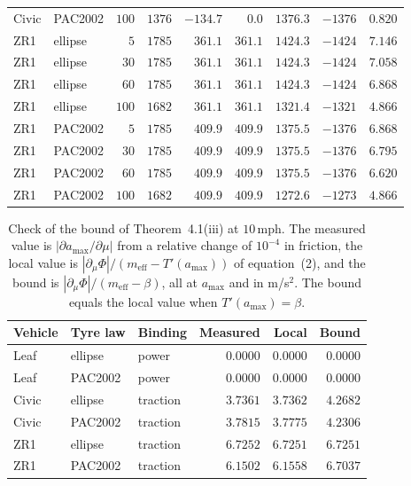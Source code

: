 \documentclass[12pt, twoside]{amsart}
\theoremstyle{definition}
\newcommand{\amax}{a_{\max}}
\newcommand{\meff}{m_{\mathrm{eff}}}
\newcommand{\mainref}[2]{#2}
\newcommand{\maineq}[2]{(#2)}
\begin{document}
\begin{table}[htbp]
\begin{tabular}{llrrrrrrr}
Civic & PAC2002 & $100$ & $1376$ & $-134.7$ & $0.0$ & $1376.3$ & $-1376$ & $0.820$\\
ZR1 & ellipse & $5$ & $1785$ & $361.1$ & $361.1$ & $1424.3$ & $-1424$ & $7.146$\\
ZR1 & ellipse & $30$ & $1785$ & $361.1$ & $361.1$ & $1424.3$ & $-1424$ & $7.058$\\
ZR1 & ellipse & $60$ & $1785$ & $361.1$ & $361.1$ & $1424.3$ & $-1424$ & $6.868$\\
ZR1 & ellipse & $100$ & $1682$ & $361.1$ & $361.1$ & $1321.4$ & $-1321$ & $4.866$\\
ZR1 & PAC2002 & $5$ & $1785$ & $409.9$ & $409.9$ & $1375.5$ & $-1376$ & $6.868$\\
ZR1 & PAC2002 & $30$ & $1785$ & $409.9$ & $409.9$ & $1375.5$ & $-1376$ & $6.795$\\
ZR1 & PAC2002 & $60$ & $1785$ & $409.9$ & $409.9$ & $1375.5$ & $-1376$ & $6.620$\\
ZR1 & PAC2002 & $100$ & $1682$ & $409.9$ & $409.9$ & $1272.6$ & $-1273$ & $4.866$\\
\bottomrule
\end{tabular}
\end{table}

\begin{table}[htbp]
\centering\small
\caption{Check of the bound of Theorem~\mainref{thm:wellposed}{4.1}\mainref{wp:lip}{{(iii)}} at $10$\,mph. The measured value is $|\partial\amax/\partial\mu|$ from a relative change of $10^{-4}$ in friction, the local value is $|\partial_\mu\Phi|/(\meff-T'(\amax))$ of equation~\maineq{eq:derivative}{2}, and the bound is $|\partial_\mu\Phi|/(\meff-\beta)$, all at $\amax$ and in m/s$^2$. The bound equals the local value when $T'(\amax)=\beta$.}\label{tab:app-lipschitz}
\begin{tabular}{lllrrr}
\toprule
Vehicle & Tyre law & Binding & Measured & Local & Bound\\
\midrule
Leaf & ellipse & power & $0.0000$ & $0.0000$ & $0.0000$\\
Leaf & PAC2002 & power & $0.0000$ & $0.0000$ & $0.0000$\\
Civic & ellipse & traction & $3.7361$ & $3.7362$ & $4.2682$\\
Civic & PAC2002 & traction & $3.7815$ & $3.7775$ & $4.2306$\\
ZR1 & ellipse & traction & $6.7252$ & $6.7251$ & $6.7251$\\
ZR1 & PAC2002 & traction & $6.1502$ & $6.1558$ & $6.7037$\\
\bottomrule
\end{tabular}
\end{table}
\FloatBarrier
\end{document}
